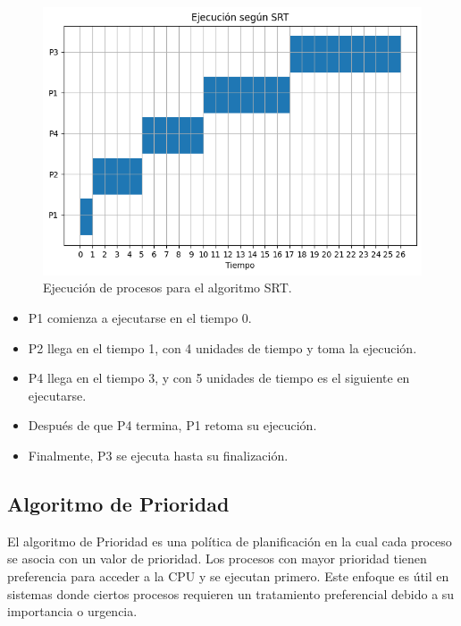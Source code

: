 \begin{figure}[H] \centering \includegraphics[width=0.8\linewidth]{Imagenes/srt_ejecucion.png}
	 \caption{Ejecución de procesos para el algoritmo SRT.} 
\end{figure}

\begin{itemize} 
	\item P1 comienza a ejecutarse en el tiempo 0. 
	\item P2 llega en el tiempo 1, con 4 unidades de tiempo y toma la ejecución. 
	\item P4 llega en el tiempo 3, y con 5 unidades de tiempo es el siguiente en ejecutarse. 
	\item Después de que P4 termina, P1 retoma su ejecución. 
	\item Finalmente, P3 se ejecuta hasta su finalización. 
\end{itemize}

\subsection{Algoritmo de Prioridad}

El algoritmo de Prioridad es una política de planificación en la cual cada proceso se asocia con un valor de prioridad. Los procesos con mayor prioridad tienen preferencia para acceder a la CPU y se ejecutan primero. Este enfoque es útil en sistemas donde ciertos procesos requieren un tratamiento preferencial debido a su importancia o urgencia.

